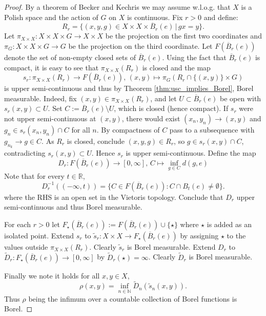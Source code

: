 \documentclass[11pt]{article}
\theoremstyle{plain}
\theoremstyle{definition}
\def\R{\mathbb{R}}
\def\N{\mathbb{N}}
\numberwithin{figure}{section}
\begin{document}
\begin{proof} 


By a theorem of Becker and Kechris \cite[Theorem 5.2.1]{BK96} we may assume w.l.o.g. that $X$ is a Polish space and the action of $G$ on $X$ is continuous.  Fix $r>0$ and define:
$$
R_r = \{(x,y,g)\in X\times X\times \overline{B}_r(e)\, |\, gx=y\}.
$$
Let $\pi_{X\times X}:X\times X\times G\rightarrow X\times X$ be the projection on the first two coordinates and $\pi_G:X\times X\times G\rightarrow G$ be the projection on the  third coordinate. Let $F(\overline{B}_r(e))$ denote the set of non-empty closed sets of  $\overline{B}_r(e)$. Using the fact that $\overline{B}_r(e)$ is compact, it is easy to see that $\pi_{X\times X}(R_r)$ is closed and the map
$$
s_r: \pi_{X\times X}(R_r)\rightarrow F(\overline{B}_r(e)),\, (x,y)\mapsto  \pi_G(R_r\cap \{(x,y)\}\times G) 
$$
is upper semi-continuous and thus by Theorem \ref{thm:usc_implies_Borel}, Borel measurable. Indeed, fix $(x,y)\in\pi_{X\times X}(R_r)$, and let $U\subset\overline B_r(e)$ be open with $s_r(x,y)\subset U$. Set $C:=\overline B_r(e)\setminus U$, which is closed (hence compact). If $s_r$ were not upper semi-continuous at $(x,y)$, there would exist $(x_n,y_n)\to(x,y)$ and $g_n\in s_r(x_n,y_n)\cap C$ for all $n$. By compactness of $C$ pass to a subsequence with $g_{n_k}\to g\in C$. As $R_r$ is closed, conclude $(x,y,g)\in R_r$, so $g\in s_r(x,y)\cap C$, contradicting $s_r(x,y)\subset U$. Hence $s_r$ is upper semi-continuous.
Define the map 
$$
D_r: F(\overline{B}_r(e))\rightarrow [0,\infty],\, C\mapsto \inf_{g\in C} d(g,e)
$$
Note that for every $t\in \R$,
$$
D_r^{-1}((-\infty,t))=\{C\in F(\overline{B}_r(e)): C\cap B_t(e)\neq\emptyset\}.$$
where the RHS is an open set in the Vietoris topology. Conclude that  $D_r$ upper semi-continuous and thus Borel measurable. 

For each $r>0$ let $F_{\star}(\overline{B}_r(e)):=F(\overline{B}_r(e))\cup \{\star\}$ where $\star$ is added as an isolated point. Extend $s_r$ to $\tilde{s}_r:X\times X\rightarrow F_{\star}(\overline{B}_r(e))$ by assigning $\star$ to the values outside $\pi_{X\times X}(R_r)$. Clearly $\tilde{s}_r$ is  Borel measurable. Extend $D_r$ to $\tilde{D}_r:F_{\star}(\overline{B}_r(e))\to [0,\infty]$ by $\tilde{D}_r(\star)=\infty$. Clearly $\tilde{D}_r$ is  Borel measurable. 

Finally we note it holds for all $x,y\in X$,
$$
\rho(x,y)=\inf_{n\in\N} \tilde{D}_n(\tilde{s}_n(x,y)).
$$
Thus $\rho$ being the infimum over a countable collection of Borel functions is Borel.


\end{proof}
\end{document}
